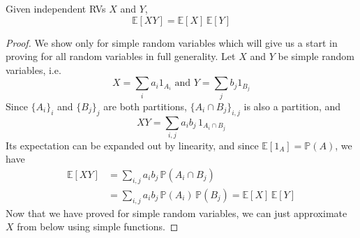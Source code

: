 \documentclass{article}
\begin{document}
    \begin{theorem}
      Given independent RVs $X$ and $Y$, 
      \begin{equation}
        \mathbb{E}[X Y] = \mathbb{E}[X] \, \mathbb{E}[Y]
      \end{equation}
    \end{theorem}
    \begin{proof}
      We show only for simple random variables which will give us a start in proving for all random variables in full generality. Let $X$ and $Y$ be simple random variables, i.e. 
      \begin{equation}
        X = \sum_i a_i 1_{A_i} \text{ and } Y = \sum_j b_j 1_{B_j}
      \end{equation}
      Since $\{A_i\}_i$ and $\{B_j\}_j$ are both partitions, $\{A_i \cap B_j\}_{i, j}$ is also a partition, and 
      \begin{equation}
        X Y = \sum_{i, j} a_i b_j \, 1_{A_i \cap B_j}
      \end{equation}
      Its expectation can be expanded out by linearity, and since $\mathbb{E}[ 1_{A} ] = \mathbb{P}(A)$, we have
      \begin{align*}
        \mathbb{E}[X Y] & = \sum_{i, j} a_i b_j \, \mathbb{P}(A_i \cap B_j) \\
        & = \sum_{i, j} a_i b_j \, \mathbb{P}(A_i)\, \mathbb{P}(B_j) = \mathbb{E}[X] \, \mathbb{E}[Y]
      \end{align*}
      Now that we have proved for simple random variables, we can just approximate $X$ from below using simple functions. 
    \end{proof}
\end{document}
